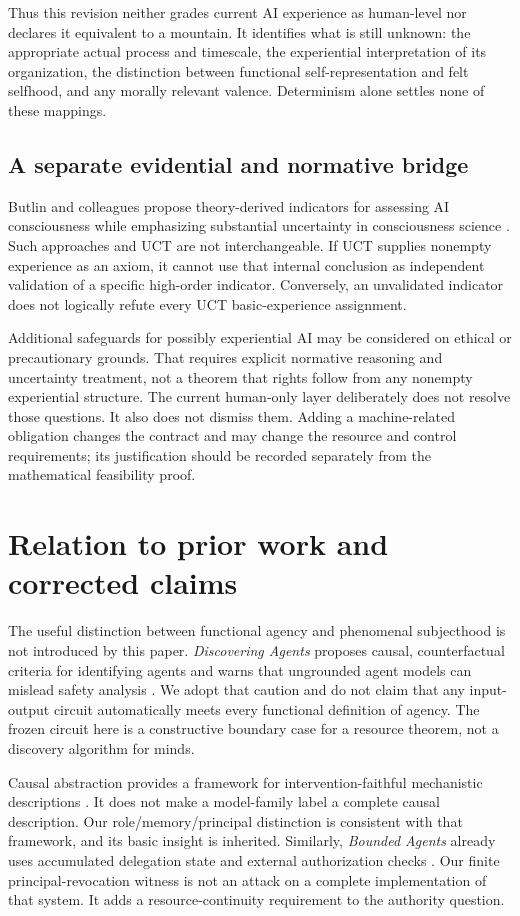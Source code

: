 Thus this revision neither grades current AI experience as human-level nor declares it equivalent to a mountain. It identifies what is still unknown: the appropriate actual process and timescale, the experiential interpretation of its organization, the distinction between functional self-representation and felt selfhood, and any morally relevant valence. Determinism alone settles none of these mappings.

\subsection{A separate evidential and normative bridge}
Butlin and colleagues propose theory-derived indicators for assessing AI consciousness while emphasizing substantial uncertainty in consciousness science \cite{butlin}. Such approaches and UCT are not interchangeable. If UCT supplies nonempty experience as an axiom, it cannot use that internal conclusion as independent validation of a specific high-order indicator. Conversely, an unvalidated indicator does not logically refute every UCT basic-experience assignment.

Additional safeguards for possibly experiential AI may be considered on ethical or precautionary grounds. That requires explicit normative reasoning and uncertainty treatment, not a theorem that rights follow from any nonempty experiential structure. The current human-only layer deliberately does not resolve those questions. It also does not dismiss them. Adding a machine-related obligation changes the contract and may change the resource and control requirements; its justification should be recorded separately from the mathematical feasibility proof.

\section{Relation to prior work and corrected claims}
The useful distinction between functional agency and phenomenal subjecthood is not introduced by this paper. \emph{Discovering Agents} proposes causal, counterfactual criteria for identifying agents and warns that ungrounded agent models can mislead safety analysis \cite{kenton}. We adopt that caution and do not claim that any input-output circuit automatically meets every functional definition of agency. The frozen circuit here is a constructive boundary case for a resource theorem, not a discovery algorithm for minds.

Causal abstraction provides a framework for intervention-faithful mechanistic descriptions \cite{geiger}. It does not make a model-family label a complete causal description. Our role/memory/principal distinction is consistent with that framework, and its basic insight is inherited. Similarly, \emph{Bounded Agents} already uses accumulated delegation state and external authorization checks \cite{muruaga}. Our finite principal-revocation witness is not an attack on a complete implementation of that system. It adds a resource-continuity requirement to the authority question.

